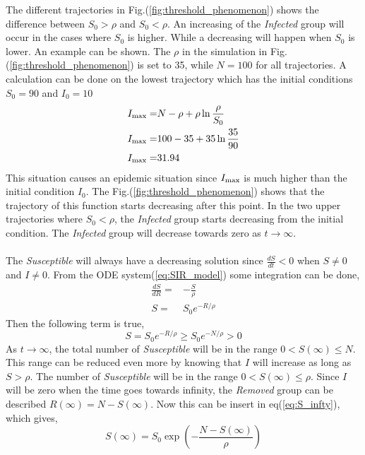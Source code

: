 \documentclass[%
twoside,                 %
final,                   %
chapterprefix=true,      %
open=right               %
10pt]{book}
\begin{document}
The different trajectories in Fig.(\ref{fig:threshold_phenomenon}) shows the difference between $S_0 > \rho$ and $S_0 < \rho$. An increasing of the \emph{Infected} group will occur in the cases where $S_0$ is higher. While a decreasing will happen when $S_0$ is lower. An example can be shown. The $\rho$ in the simulation in Fig.(\ref{fig:threshold_phenomenon}) is set to 35, while $N=100$ for all trajectories. A calculation can be done on the lowest trajectory which has the initial conditions $S_0= 90$ and $I_0= 10$
\begin{align*}
I_{\textrm{max}} =& N-\rho + \rho \ln \frac{\rho}{S_0}\\
I_{\textrm{max}} =& 100-35 + 35 \ln \frac{35}{90}\\
I_{\textrm{max}} =& 31.94
\end{align*}
This situation causes an epidemic situation since $I_{\textrm{max}}$ is much higher than the initial condition $I_0$. The Fig.(\ref{fig:threshold_phenomenon}) shows that the trajectory of this function starts decreasing after this point. In the two upper trajectories where $S_0 < \rho$, the \emph{Infected} group starts decreasing from the initial condition. The \emph{Infected} group will decrease towards zero as $t\rightarrow \infty$.
\\
\\
The \emph{Susceptible} will always have a decreasing solution since $\frac{dS}{dt} < 0$ when $S\neq0$ and $I\neq0$. From the ODE system(\ref{eq:SIR_model}) some integration can be done,
\begin{equation} \label{eq:S_infty}
	\begin{aligned}
	\frac{dS}{dR} =& -\frac{S}{\rho}\\
	S =& S_0e^{-R/\rho} 
	\end{aligned}
\end{equation}
Then the following term is true,
\begin{equation} 
S = S_0e^{-R/\rho} \geq S_0e^{-N/\rho} > 0
\end{equation}
As $t\rightarrow \infty$, the total number of \emph{Susceptible} will be in the range $0 < S(\infty)\leq N$. This range can be reduced even more by knowing that $I$ will increase as long as $S> \rho$. The number of \emph{Susceptible} will be in the range $0 < S(\infty)\leq \rho$. Since $I$ will be zero when the time goes towards infinity, the \emph{Removed} group can be described $R(\infty)= N -S(\infty)$. Now this can be insert in eq(\ref{eq:S_infty}), which gives,
\begin{equation}
S(\infty) = S_0 \exp\left(-\frac{N-S(\infty)}{\rho}\right)
\end{equation}
\end{document}
